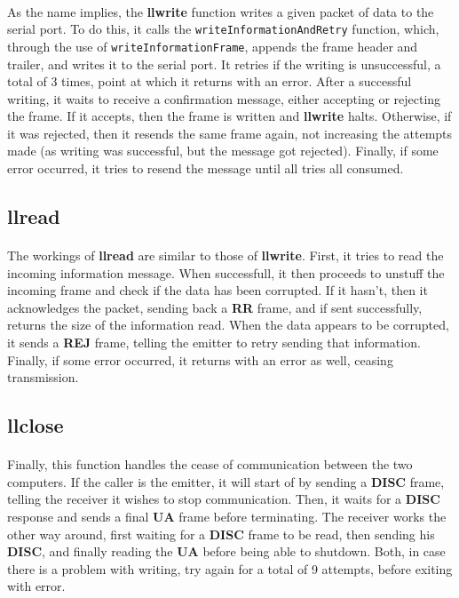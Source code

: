 \documentclass[11pt]{article}
\begin{document}
\paragraph{}As the name implies, the \textbf{llwrite} function writes a given packet of data to the serial
port. To do this, it calls the \verb|writeInformationAndRetry| function, which, through the use of
\verb|writeInformationFrame|, appends the frame header and trailer, and writes it to the serial port. It
retries if the writing is unsuccessful, a total of 3 times, point at which it returns with an error.
After a successful writing, it waits to receive a confirmation message, either accepting or rejecting the
frame. If it accepts, then the frame is written and \textbf{llwrite} halts. Otherwise, if it was rejected, then it
resends the same frame again, not increasing the attempts made (as writing was successful, but the message
got rejected). Finally, if some error occurred, it tries to resend the message until all tries all consumed.

\subsection*{llread}

\paragraph{}The workings of \textbf{llread} are similar to those of \textbf{llwrite}. First, it tries to read the incoming information message. When successfull, it then proceeds to unstuff the incoming frame and
check if the data has been corrupted. If it hasn't, then it acknowledges the packet, sending back a
\textbf{RR} frame, and if sent successfully, returns the size of the information read. When the data appears
to be corrupted, it sends a \textbf{REJ} frame, telling the emitter to retry sending that information.
Finally, if some error occurred, it returns with an error as well, ceasing transmission.

\subsection*{llclose}

\paragraph{}Finally, this function handles the cease of communication between the two computers. If the
caller is the emitter, it will start of by sending a \textbf{DISC} frame, telling the receiver it wishes to
stop communication. Then, it waits for a \textbf{DISC} response and sends a final \textbf{UA} frame before
terminating. The receiver works the other way around, first waiting for a \textbf{DISC} frame to be read,
then sending his \textbf{DISC}, and finally reading the \textbf{UA} before being able to shutdown. Both, in
case there is a problem with writing, try again for a total of 9 attempts, before exiting with error.
\end{document}
